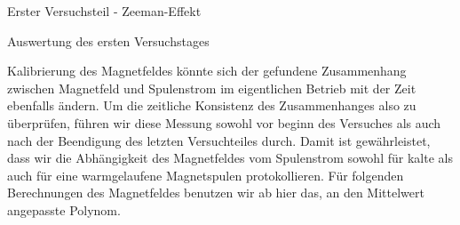 \documentclass[pdftex, a4paper,11pt, twoside, ngerman]{report}
\begin{document}
\begin{chapter}{Erster Versuchsteil - Zeeman-Effekt}
\begin{section}{Auswertung des ersten Versuchstages}
\begin{subsection}{Kalibrierung des Magnetfeldes}
        könnte sich der gefundene Zusammenhang zwischen Magnetfeld und
        Spulenstrom im eigentlichen Betrieb mit der Zeit ebenfalls ändern. Um
        die zeitliche Konsistenz des Zusammenhanges also zu überprüfen, führen
        wir diese Messung sowohl vor beginn des Versuches als auch nach der
        Beendigung des letzten Versuchteiles durch. Damit ist gewährleistet,
        dass wir die Abhängigkeit des Magnetfeldes vom Spulenstrom sowohl für
        kalte als auch für eine warmgelaufene
        Magnetspulen protokollieren.
        \newline
        Für folgenden Berechnungen des Magnetfeldes benutzen wir ab hier das,
        an den Mittelwert angepasste Polynom.
        
      \end{subsection}
      
      
      

\end{section}
\end{chapter}
\end{document}
